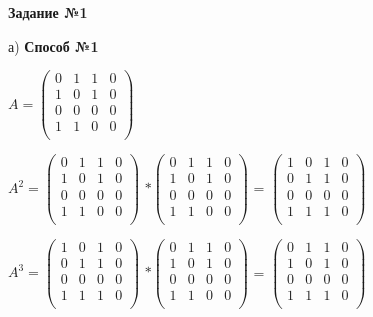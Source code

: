 \documentclass{article}
\begin{document}
\newpage
\large
\begin{center}
		\textbf{Задание №1}
\end{center}
\par
а) \textbf{Способ №1}
\vspace{5mm}
\par \hspace{8mm} $A = 
\begin{pmatrix}
	0 & 1 & 1 & 0\\
	1 & 0 & 1 & 0\\
	0 & 0 & 0 & 0\\
	1 & 1 & 0 & 0\\
\end{pmatrix}$
\vspace{5mm}
\par

\hspace{8mm} $A^2 = 
\begin{pmatrix}
	0 & 1 & 1 & 0\\
	1 & 0 & 1 & 0\\
	0 & 0 & 0 & 0\\
	1 & 1 & 0 & 0\\
\end{pmatrix}$
$*\begin{pmatrix}
	0 & 1 & 1 & 0\\
	1 & 0 & 1 & 0\\
	0 & 0 & 0 & 0\\
	1 & 1 & 0 & 0\\
\end{pmatrix}$ =
$\begin{pmatrix}
	1 & 0 & 1 & 0\\
	0 & 1 & 1 & 0\\
	0 & 0 & 0 & 0\\
	1 & 1 & 1 & 0\\
\end{pmatrix}$

\vspace{5mm}
\par

\hspace{8mm} $A^3 = 
\begin{pmatrix}
	1 & 0 & 1 & 0\\
	0 & 1 & 1 & 0\\
	0 & 0 & 0 & 0\\
	1 & 1 & 1 & 0\\
\end{pmatrix}$
$*\begin{pmatrix}
	0 & 1 & 1 & 0\\
	1 & 0 & 1 & 0\\
	0 & 0 & 0 & 0\\
	1 & 1 & 0 & 0\\
\end{pmatrix}$ =
$\begin{pmatrix}
	0 & 1 & 1 & 0\\
	1 & 0 & 1 & 0\\
	0 & 0 & 0 & 0\\
	1 & 1 & 1 & 0\\
\end{pmatrix}$ 
\end{document}
